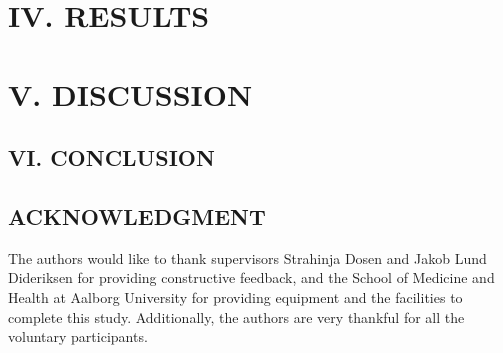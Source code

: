 \begin{multicols}{2}
	
	\section*{IV. RESULTS}%
	
	
	\section*{V. DISCUSSION}%
	
	
	\subsection*{VI. CONCLUSION}%
	
%	
	
	
	
	\subsection*{ACKNOWLEDGMENT}
	
	The authors would like to thank supervisors Strahinja Dosen and Jakob Lund Dideriksen for providing constructive feedback, and the School of Medicine and Health at Aalborg University for providing equipment and the facilities to complete this study. Additionally, the authors are very thankful for all the voluntary participants. 

{\small 
\renewcommand*{\bibfont}{\small}
	\printbibliography
	}

	
	
\end{multicols}



